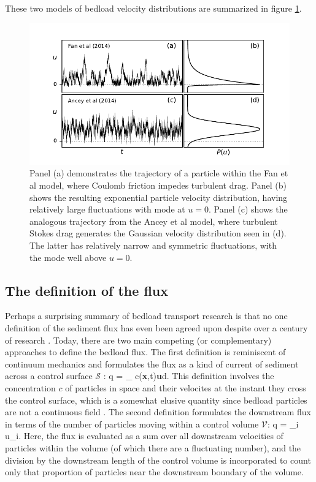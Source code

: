 These two models of bedload velocity distributions are summarized in figure \ref{fig:fanAncey}.
\begin{figure}[!htbp]
	\includegraphics[width=\linewidth,keepaspectratio]{./figures/ch1/fanAncey.pdf}
	\caption{Panel (a) demonstrates the trajectory of a particle within the Fan et al model, where Coulomb friction impedes turbulent drag. Panel (b) shows the resulting exponential particle velocity distribution, having relatively large fluctuations with mode at $u=0$.
	Panel (c) shows the analogous trajectory from the Ancey et al model, where turbulent Stokes drag generates the Gaussian velocity distribution seen in (d). The latter has relatively narrow and symmetric fluctuations, with the mode well above $u=0$.}
	\label{fig:fanAncey}
\end{figure}

\subsection{The definition of the flux}

Perhaps a surprising summary of bedload transport research is that no one definition of the sediment flux has even been agreed upon despite over a century of research \citep{Ballio2018}.
Today, there are two main competing (or complementary) approaches to define the bedload flux. 
The first definition is reminiscent of continuum mechanics and formulates the flux as a kind of current of sediment across a control surface $\mathcal{S}$ \citep{Furbish2012,Heyman2016, Ballio2014}: 
\be q = \int_ c(\textbf{x},t)\textbf{u}\cdot d. \ee
This definition involves the concentration $c$ of particles in space and their velocites at the instant they cross the control surface, which is a somewhat elusive quantity since bedload particles are not a continuous field \citep{Heyman2016}.
The second definition formulates the downstream flux in terms of the number of particles moving within a control volume $\mathcal{V}$:
\be q =  \sum_{i\in{}} u_i. \label{eq:controlflux}\ee
Here, the flux is evaluated as a sum over all downstream velocities of particles within the volume (of which there are a fluctuating number), and the division by the downstream length of the control volume is incorporated to count only that proportion of particles near the downstream boundary of the volume.

